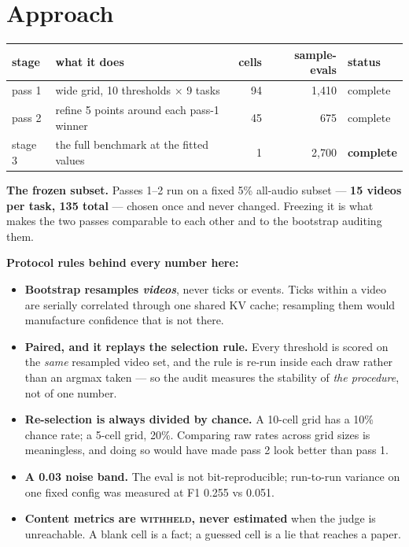 \documentclass[11pt,a4paper]{article}
\begin{document}
\section{Approach}

\begin{center}\small
\begin{tabular}{llrrl}
\toprule
stage & what it does & cells & sample-evals & status \\
\midrule
pass 1  & wide grid, 10 thresholds $\times$ 9 tasks & 94 & 1{,}410 & complete \\
pass 2  & refine 5 points around each pass-1 winner & 45 &   675 & complete \\
stage 3 & the full benchmark at the fitted values   &  1 & 2{,}700 & \textbf{complete} \\
\bottomrule
\end{tabular}
\end{center}

\noindent\textbf{The frozen subset.} Passes 1--2 run on a fixed 5\% all-audio subset
--- \textbf{15 videos per task, 135 total} --- chosen once and never changed.
Freezing it is what makes the two passes comparable to each other and to the
bootstrap auditing them.

\noindent\textbf{Protocol rules behind every number here:}

\begin{itemize}
\item \textbf{Bootstrap resamples \emph{videos}}, never ticks or events. Ticks within
a video are serially correlated through one shared KV cache; resampling them would
manufacture confidence that is not there.
\item \textbf{Paired, and it replays the selection rule.} Every threshold is scored
on the \emph{same} resampled video set, and the rule is re-run inside each draw
rather than an argmax taken --- so the audit measures the stability of \emph{the
procedure}, not of one number.
\item \textbf{Re-selection is always divided by chance.} A 10-cell grid has a 10\%
chance rate; a 5-cell grid, 20\%. Comparing raw rates across grid sizes is
meaningless, and doing so would have made pass 2 look better than pass 1.
\item \textbf{A 0.03 noise band.} The eval is not bit-reproducible; run-to-run
variance on one fixed config was measured at F1 0.255 vs 0.051.
\item \textbf{Content metrics are \textsc{withheld}, never estimated} when the judge
is unreachable. A blank cell is a fact; a guessed cell is a lie that reaches a paper.
\end{itemize}
\end{document}
